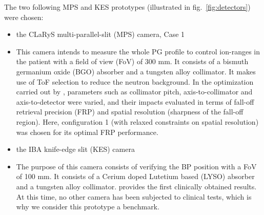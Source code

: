 \documentclass[a4paper,english]{article}
\begin{document}
The two following MPS and KES prototypes (illustrated in fig.~\ref{fig:detectors}) were chosen:
\begin{itemize}[noitemsep]
\item the CLaRyS multi-parallel-slit (MPS) camera, Case 1 \citep{Pinto2014a}
\item[] This camera intends to measure the whole PG profile to control ion-ranges in the patient with a field of view (FoV) of 300 mm. It consists of a bismuth germanium oxide (BGO) absorber and a tungsten alloy collimator. It makes use of ToF selection to reduce the neutron background. In the optimization carried out by \cite{Pinto2014a}, parameters such as collimator pitch, axis-to-collimator and axis-to-detector were varied, and their impacts evaluated in terms of fall-off retrieval precision (FRP) and spatial resolution (sharpness of the fall-off region). Here, configuration 1 (with relaxed constraints on spatial resolution) was chosen for its optimal FRP performance.
\item the IBA knife-edge slit (KES) camera \citep{Perali2014,Sterpin2015}
\item[] The purpose of this camera consists of verifying the BP position with a FoV of 100 mm. It consists of a Cerium doped Lutetium based (LYSO) absorber and a tungsten alloy collimator.\cite{Richter2016} provides the first clinically obtained results. At this time, no other camera has been subjected to clinical tests, which is why we consider this prototype a benchmark.
\end{itemize}
\end{document}
